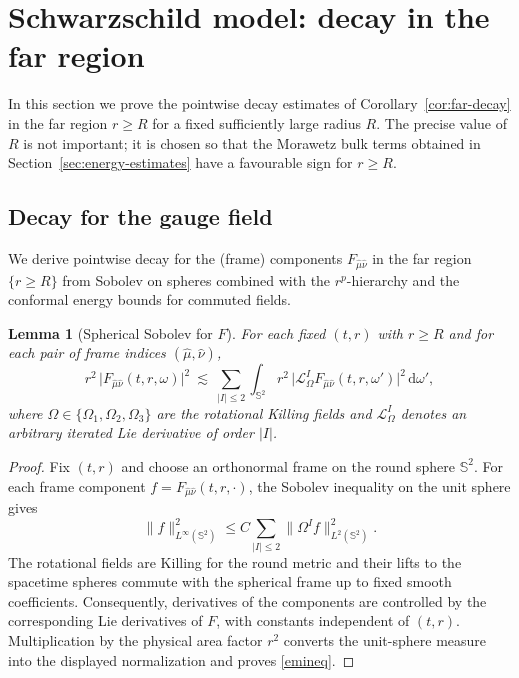 \documentclass[11pt]{article}
\numberwithin{equation}{section}
\theoremstyle{plain}
\newtheorem{lemma}[theorem]{Lemma}
\theoremstyle{definition}
\theoremstyle{remark}
\newcommand{\dd}{\mathrm{d}}
\begin{document}
\section{Schwarzschild model: decay in the far region}
\label{sec:decayfaraway}
In this section we prove the pointwise decay estimates of Corollary~\ref{cor:far-decay} in the far region $r\ge R$ for a fixed sufficiently large radius $R$. The precise value of $R$ is not important; it is chosen so that the Morawetz bulk terms obtained in Section~\ref{sec:energy-estimates} have a favourable sign for $r\ge R$.



\subsection{Decay for the gauge field}
\label{subsec:far-decay-F}

We derive pointwise decay for the (frame) components $F_{\hat\mu\hat\nu}$ in the far region $\{r\ge R\}$ from Sobolev on spheres combined with the $r^{p}$-hierarchy and the conformal energy bounds for commuted fields.

\begin{lemma}[Spherical Sobolev for $F$]\label{lem:sobolev-F-sphere}
For each fixed $(t,r)$ with $r\ge R$ and for each pair of frame indices $(\hat\mu,\hat\nu)$,
\begin{equation}\label{emineq}
 r^{2}\,\bigl|F_{\hat\mu\hat\nu}(t,r,\omega)\bigr|^{2}
 \ \lesssim\ \sum_{|I|\le 2}\int_{\mathbb S^{2}} r^{2}\,\bigl|\mathcal L_{\Omega}^{I}F_{\hat\mu\hat\nu}(t,r,\omega')\bigr|^{2}\,\dd\omega',
\end{equation}
where $\Omega\in\{\Omega_{1},\Omega_{2},\Omega_{3}\}$ are the rotational Killing fields and $\mathcal L_{\Omega}^{I}$ denotes an arbitrary iterated Lie derivative of order $|I|$.
\end{lemma}


\begin{proof}
Fix \((t,r)\) and choose an orthonormal frame on the round sphere \(\mathbb S^2\).  For each frame component \(f=F_{\hat\mu\hat\nu}(t,r,\cdot)\), the Sobolev inequality on the unit sphere gives
\[
 \|f\|_{L^\infty(\mathbb S^2)}^2
 \le C\sum_{|I|\le2}\|\Omega^I f\|_{L^2(\mathbb S^2)}^2.
\]
The rotational fields are Killing for the round metric and their lifts to the spacetime spheres commute with the spherical frame up to fixed smooth coefficients.  Consequently, derivatives of the components are controlled by the corresponding Lie derivatives of \(F\), with constants independent of \((t,r)\).  Multiplication by the physical area factor \(r^2\) converts the unit-sphere measure into the displayed normalization and proves \eqref{emineq}.
\end{proof}
\end{document}
